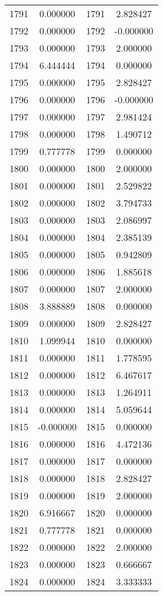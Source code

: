 \documentclass[12pt]{article}
\begin{document}
\begin{longtable}{@{}cccc@{}}
1791 & 0.000000 & 1791 & 2.828427 \\
1792 & 0.000000 & 1792 & -0.000000 \\
1793 & 0.000000 & 1793 & 2.000000 \\
1794 & 6.444444 & 1794 & 0.000000 \\
1795 & 0.000000 & 1795 & 2.828427 \\
1796 & 0.000000 & 1796 & -0.000000 \\
1797 & 0.000000 & 1797 & 2.981424 \\
1798 & 0.000000 & 1798 & 1.490712 \\
1799 & 0.777778 & 1799 & 0.000000 \\
1800 & 0.000000 & 1800 & 2.000000 \\
1801 & 0.000000 & 1801 & 2.529822 \\
1802 & 0.000000 & 1802 & 3.794733 \\
1803 & 0.000000 & 1803 & 2.086997 \\
1804 & 0.000000 & 1804 & 2.385139 \\
1805 & 0.000000 & 1805 & 0.942809 \\
1806 & 0.000000 & 1806 & 1.885618 \\
1807 & 0.000000 & 1807 & 2.000000 \\
1808 & 3.888889 & 1808 & 0.000000 \\
1809 & 0.000000 & 1809 & 2.828427 \\
1810 & 1.099944 & 1810 & 0.000000 \\
1811 & 0.000000 & 1811 & 1.778595 \\
1812 & 0.000000 & 1812 & 6.467617 \\
1813 & 0.000000 & 1813 & 1.264911 \\
1814 & 0.000000 & 1814 & 5.059644 \\
1815 & -0.000000 & 1815 & 0.000000 \\
1816 & 0.000000 & 1816 & 4.472136 \\
1817 & 0.000000 & 1817 & 0.000000 \\
1818 & 0.000000 & 1818 & 2.828427 \\
1819 & 0.000000 & 1819 & 2.000000 \\
1820 & 6.916667 & 1820 & 0.000000 \\
1821 & 0.777778 & 1821 & 0.000000 \\
1822 & 0.000000 & 1822 & 2.000000 \\
1823 & 0.000000 & 1823 & 0.666667 \\
1824 & 0.000000 & 1824 & 3.333333 \\

\end{longtable}
\end{document}
